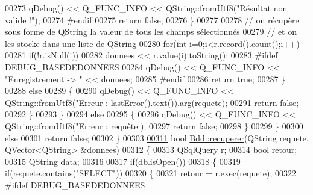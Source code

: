\begin{DoxyCode}
{{{{{{{{00273                     qDebug() << Q\_FUNC\_INFO << QString::fromUtf8(\textcolor{stringliteral}{"Résultat non valide !"});
00274 \textcolor{preprocessor}{                    #endif}
00275                     \textcolor{keywordflow}{return} \textcolor{keyword}{false};
00276                 \}
00277 
00278                 \textcolor{comment}{// on récupère sous forme de QString la valeur de tous les champs sélectionnés}
00279                 \textcolor{comment}{// et on les stocke dans une liste de QString}
00280                 \textcolor{keywordflow}{for}(\textcolor{keywordtype}{int} i=0;i<r.record().count();i++)
00281                     \textcolor{keywordflow}{if}(!r.isNull(i))
00282                         donnees << r.value(i).toString();
00283 \textcolor{preprocessor}{                #ifdef DEBUG\_BASEDEDONNEES}
00284                 qDebug() << Q\_FUNC\_INFO << \textcolor{stringliteral}{"Enregistrement -> "} << donnees;
00285 \textcolor{preprocessor}{                #endif}
00286                 \textcolor{keywordflow}{return} \textcolor{keyword}{true};
00287             \}
00288             \textcolor{keywordflow}{else}
00289             \{
00290                 qDebug() << Q\_FUNC\_INFO << QString::fromUtf8(\textcolor{stringliteral}{"Erreur : %
      lastError().text()).arg(requete);
00291                 \textcolor{keywordflow}{return} \textcolor{keyword}{false};
00292             \}
00293         \}
00294         \textcolor{keywordflow}{else}
00295         \{
00296             qDebug() << Q\_FUNC\_INFO << QString::fromUtf8(\textcolor{stringliteral}{"Erreur : requête %
      );
00297             \textcolor{keywordflow}{return} \textcolor{keyword}{false};
00298         \}
00299     \}
00300     \textcolor{keywordflow}{else}
00301         \textcolor{keywordflow}{return} \textcolor{keyword}{false};
00302 \}
00303 
\hyperlink{class_bdd_ae155534b5b1a9daa94ee2106fcf0f37d}{00311} \textcolor{keywordtype}{bool} \hyperlink{class_bdd_a8f25d29d309041bbf875700db0efd97b}{Bdd::recuperer}(QString requete, QVector<QString> &donnees)
00312 \{
00313     QSqlQuery r;
00314     \textcolor{keywordtype}{bool} retour;
00315     QString data;
00316 
00317     \textcolor{keywordflow}{if}(\hyperlink{class_bdd_a8628c1686deda86999f86689c3e7268e}{db}.isOpen())
00318     \{
00319         \textcolor{keywordflow}{if}(requete.contains(\textcolor{stringliteral}{"SELECT"}))
00320         \{
00321             retour = r.exec(requete);
00322 \textcolor{preprocessor}{            #ifdef DEBUG\_BASEDEDONNEES}
}}}}}}}}}}
\end{DoxyCode}
